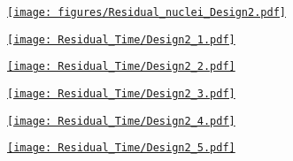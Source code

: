 \documentclass[xcolor={dvipsnames}]{beamer}
\begin{document}
\begin{frame}[plain]
 \hypertarget{Residual_nuclei_Design2}{\hyperlink{residualtimesprev_Design2}{\texttt{[image: figures/Residual\_nuclei\_Design2.pdf]}}}
\end{frame}
\begin{frame}[plain]
 \hypertarget{Residual_nuclei_minute_Design2}{\hyperlink{residualtimesprev_Design2}{\texttt{[image: Residual\_Time/Design2\_1.pdf]}}}
\end{frame}
\begin{frame}[plain]
 \hypertarget{Residual_nuclei_hour_Design2}{\hyperlink{residualtimesprev_Design2}{\texttt{[image: Residual\_Time/Design2\_2.pdf]}}}
\end{frame}
\begin{frame}[plain]
 \hypertarget{Residual_nuclei_day_Design2}{\hyperlink{residualtimesprev_Design2}{\texttt{[image: Residual\_Time/Design2\_3.pdf]}}}
\end{frame}
\begin{frame}[plain]
 \hypertarget{Residual_nuclei_month_Design2}{\hyperlink{residualtimesprev_Design2}{\texttt{[image: Residual\_Time/Design2\_4.pdf]}}}
\end{frame}
\begin{frame}[plain]
 \hypertarget{Residual_nuclei_year_Design2}{\hyperlink{residualtimesprev_Design2}{\texttt{[image: Residual\_Time/Design2\_5.pdf]}}}
\end{frame}
\end{document}
